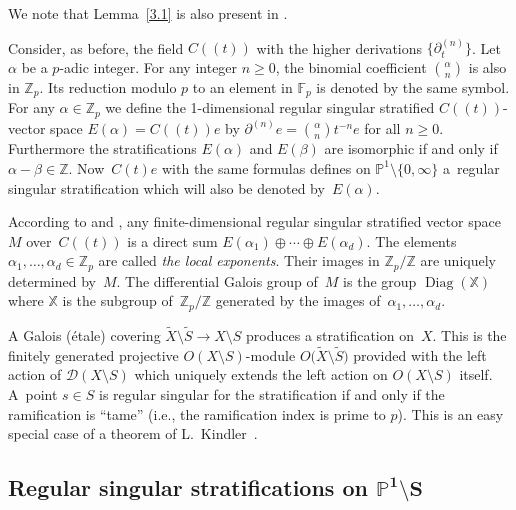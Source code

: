 \documentclass[10pt,a4paper]{amsart}
\numberwithin{equation}{section}
\begin{document}
We note that Lemma~\ref{3.1} is also present in \cite[Proposition 3.2.3]{K}.

Consider, as before, the field $C((t))$ with the higher derivations $\big\{\partial_t ^{(n)}\big\}$. Let~$\alpha$ be a $p$-adic integer. For any integer $n\geq 0$, the binomial coefficient ${\alpha \choose n}$ is also in $\mathbb{Z}_p$. Its reduction modulo $p$ to an element in $\mathbb{F}_p$ is denoted by the same symbol. For any $\alpha \in \mathbb{Z}_p$ we define the 1-dimensional regular singular stratified $C((t))$-vector space $E(\alpha )=C((t))e$ by $\partial ^{(n)}e={\alpha \choose n }t^{-n}e$ for all $n\geq 0$. Furthermore the stratifications $E(\alpha )$ and $E(\beta)$ are isomorphic if and only if $\alpha -\beta \in \mathbb{Z}$. Now~$C(t)e$ with the same formulas defines on $\mathbb{P}^1\setminus \{0,\infty \}$ a~regular singular stratification which will also be denoted by~$E(\alpha )$.

According to \cite[Theorem 3.3]{Gie} and \cite[Proposition 6.1]{Ma-vdP1}, any finite-dimensional regular singular stratified vector space~$M$ over~$C((t))$ is a direct sum $E(\alpha _1)\oplus \cdots \oplus E(\alpha _d)$. The elements $\alpha_1,\dots ,\alpha _d\in \mathbb{Z}_p$ are called {\it the local exponents}. Their images in $\mathbb{Z}_p/\mathbb{Z}$ are uniquely determined by~$M$. The differential Galois group of~$M$ is the group $\operatorname{Diag}(\mathbb{X})$ where $\mathbb{X}$ is the subgroup of~$\mathbb{Z}_p/\mathbb{Z}$ generated by the images of~$\alpha_1,\dots ,\alpha _d$.

A Galois (\'etale) covering $\tilde{X}\setminus \tilde{S}\rightarrow X\setminus S$ produces a stratification on~$X$. This is the finitely generated projective $O(X\setminus S)$-module $O\big(\tilde{X}\setminus \tilde{S}\big)$ provided with the left action of $\mathcal{D}(X\setminus S)$ which uniquely extends the left action on $O(X\setminus S)$ itself. A~point $s\in S$ is regular singular for the stratification if and only if the ramification is ``tame'' (i.e., the ramification index is prime to $p$). This is an easy special case of a theorem of L.~Kindler~\cite{Ki}.

 \subsection[Regular singular stratifications on $\mathbb{P}^1\setminus S$]{Regular singular stratifications on $\boldsymbol{\mathbb{P}^1\setminus S}$}\label{section3.1}
\end{document}

